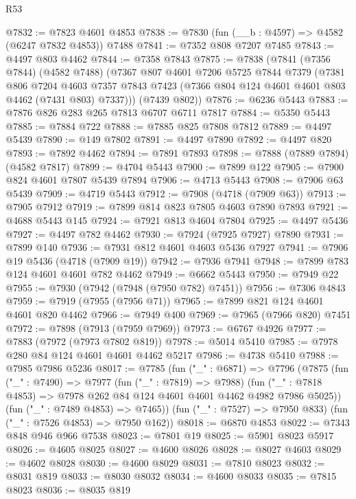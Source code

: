 \begin{lexlean}{R53}
\begin{coremodule}
@7832 := @7823 @4601 @4853
@7838 := @7830 (fun (__b : @4597) => @4582 (@6247 @7832 @4853)) @7488
@7841 := @7352 @808 @7207 @7485
@7843 := @4497 @803 @4462
@7844 := @7358 @7843
@7875 := @7838
    (@7841
      (@7356 @7844)
      (@4582 @7488)
      (@7367
        @807
        @4601
        @7206
        @5725
        @7844
        @7379
        (@7381
          @806
          @7204
          @4603
          @7357
          @7843
          @7423
          (@7366 @804 @124 @4601 @4601 @803 @4462 (@7431 @803) @7337)))
      (@7439 @802))
@7876 := @6236 @5443
@7883 := @7876 @826 @283 @265 @7813 @6707 @6711 @7817
@7884 := @5350 @5443
@7885 := @7884 @722
@7888 := @7885 @825 @7808 @7812
@7889 := @4497 @5439
@7890 := @149 @7802
@7891 := @4497 @7890
@7892 := @4497 @820
@7893 := @7892 @4462
@7894 := @7891 @7893
@7898 := @7888 (@7889 @7894) (@4582 @7817)
@7899 := @4704 @5443
@7900 := @7899 @122
@7905 := @7900 @824 @4601 @7807 @5439 @7894
@7906 := @4713 @5443
@7908 := @7906 @63 @5439
@7909 := @4719 @5443
@7912 := @7908 (@4718 (@7909 @63))
@7913 := @7905 @7912
@7919 := @7899 @814 @823 @7805 @4603 @7890 @7893
@7921 := @4688 @5443 @145
@7924 := @7921 @813 @4604 @7804
@7925 := @4497 @5436
@7927 := @4497 @782 @4462
@7930 := @7924 (@7925 @7927) @7890
@7931 := @7899 @140
@7936 := @7931 @812 @4601 @4603 @5436 @7927
@7941 := @7906 @19 @5436 (@4718 (@7909 @19))
@7942 := @7936 @7941
@7948 := @7899 @783 @124 @4601 @4601 @782 @4462
@7949 := @6662 @5443
@7950 := @7949 @22
@7955 := @7930 (@7942 (@7948 (@7950 @782) @7451))
@7956 := @7306 @4843
@7959 := @7919 (@7955 (@7956 @71))
@7965 := @7899 @821 @124 @4601 @4601 @820 @4462
@7966 := @7949 @400
@7969 := @7965 (@7966 @820) @7451
@7972 := @7898 (@7913 (@7959 @7969))
@7973 := @6767 @4926
@7977 := @7883 (@7972 (@7973 @7802 @819))
@7978 := @5014 @5410
@7985 := @7978 @280 @84 @124 @4601 @4601 @4462 @5217
@7986 := @4738 @5410
@7988 := @7985 @7986 @5236
@8017 := @7785
    (fun ("_" : @6871) =>
    @7796
      (@7875
        (fun ("_" : @7490) =>
        @7977
          (fun ("_" : @7819) => @7988)
          (fun ("_" : @7818 @4853) => @7978 @262 @84 @124 @4601 @4601 @4462 @4982 @7986 @5025))
        (fun ("_" : @7489 @4853) => @7465))
      (fun ("_" : @7527) => @7950 @833)
      (fun ("_" : @7526 @4853) => @7950 @162))
@8018 := @6870 @4853
@8022 := @7343 @848 @946 @966 @7538
@8023 := @7801 @19
@8025 := @5901 @8023 @5917
@8026 := @4605 @8025
@8027 := @4600 @8026
@8028 := @8027 @4603
@8029 := @4602 @8028
@8030 := @4600 @8029
@8031 := @7810 @8023
@8032 := @8031 @819
@8033 := @8030 @8032
@8034 := @4600 @8033
@8035 := @7815 @8023
@8036 := @8035 @819

\end{coremodule}
\end{lexlean}
